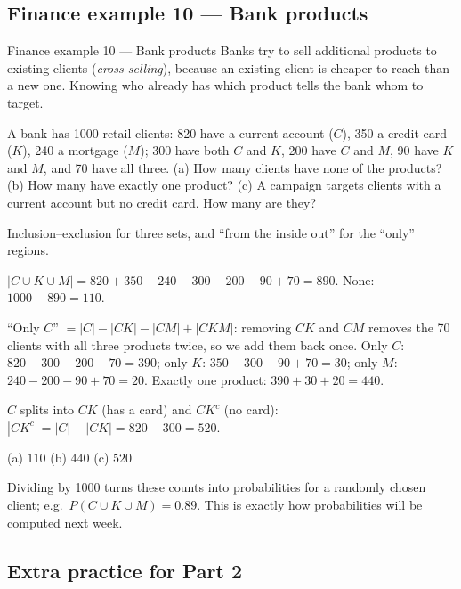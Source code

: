 \subsection{Finance example 10 --- Bank products}

\begin{fin}{Finance example 10 --- Bank products}
	\context Banks try to sell additional products to existing clients
	(\emph{cross-selling}), because an existing client is cheaper to reach than
	a new one. Knowing who already has which product tells the bank whom to
	target.

	A bank has 1000 retail clients: 820 have a current account ($C$), 350 a
	credit card ($K$), 240 a mortgage ($M$); 300 have both $C$ and $K$, 200
	have $C$ and $M$, 90 have $K$ and $M$, and 70 have all three. (a) How many
	clients have none of the products? (b) How many have exactly one product?
	(c) A campaign targets clients with a current account but no credit card.
	How many are they?
\end{fin}
\workspace{4cm}

\ifsolutions
	\soltitle
	\idea Inclusion--exclusion for three sets, and ``from the inside out'' for the
	``only'' regions.

	 $|C\cup K\cup M|=820+350+240-300-200-90+70=890$. None:
	$1000-890=110$.

	 ``Only $C$'' $=|C|-|CK|-|CM|+|CKM|$: removing $CK$ and $CM$
	removes the 70 clients with all three products twice, so we add them back
	once. Only $C$: $820-300-200+70=390$; only $K$: $350-300-90+70=30$; only
	$M$: $240-200-90+70=20$. Exactly one product: $390+30+20=440$.

	 $C$ splits into $CK$ (has a card) and $CK^c$ (no card):
	$|CK^c|=|C|-|CK|=820-300=520$.
	\begin{answer}
		(a) $110$ \quad (b) $440$ \quad (c) $520$
	\end{answer}
	\begin{remark}
		Dividing by 1000 turns these counts into probabilities for a randomly
		chosen client; e.g.\ $P(C\cup K\cup M)=0.89$. This is exactly how
		probabilities will be computed next week.
	\end{remark}
\fi

\subsection{Extra practice for Part 2}

